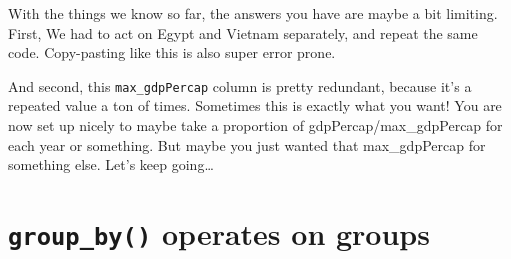 \documentclass[]{book}
\newenvironment{Shaded}{\begin{snugshade}}{\end{snugshade}}
\newcommand{\KeywordTok}[1]{\textcolor[rgb]{0.13,0.29,0.53}{\textbf{#1}}}
\newcommand{\DataTypeTok}[1]{\textcolor[rgb]{0.13,0.29,0.53}{#1}}
\newcommand{\StringTok}[1]{\textcolor[rgb]{0.31,0.60,0.02}{#1}}
\newcommand{\CommentTok}[1]{\textcolor[rgb]{0.56,0.35,0.01}{\textit{#1}}}
\newcommand{\OperatorTok}[1]{\textcolor[rgb]{0.81,0.36,0.00}{\textbf{#1}}}
\newcommand{\NormalTok}[1]{#1}
\theoremstyle{definition}
\theoremstyle{definition}
\theoremstyle{definition}
\theoremstyle{remark}
\begin{document}
\begin{Shaded}
\end{Shaded}

With the things we know so far, the answers you have are maybe a bit
limiting. First, We had to act on Egypt and Vietnam separately, and
repeat the same code. Copy-pasting like this is also super error prone.

And second, this \texttt{max\_gdpPercap} column is pretty redundant,
because it's a repeated value a ton of times. Sometimes this is exactly
what you want! You are now set up nicely to maybe take a proportion of
gdpPercap/max\_gdpPercap for each year or something. But maybe you just
wanted that max\_gdpPercap for something else. Let's keep going\ldots{}

\section{\texorpdfstring{\texttt{group\_by()} operates on
groups}{group\_by() operates on groups}}\label{group_by-operates-on-groups}
\end{document}
